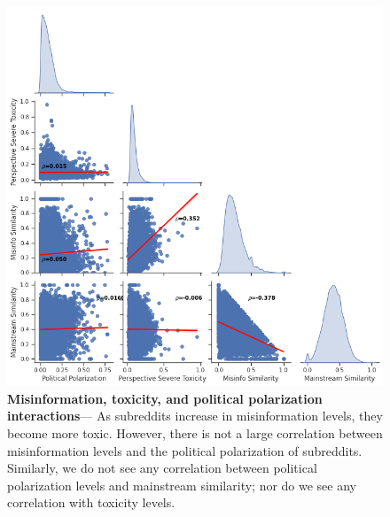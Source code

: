 \begin{figure}
\begin{minipage}[l]{0.6\textwidth}
\includegraphics[width=1\columnwidth]{figures/cross_graphs.png} 
\end{minipage}
\begin{minipage}[l]{0.35\textwidth}
\caption{\textbf{Misinformation, toxicity, and political polarization interactions}--- As subreddits increase in misinformation levels, they become more toxic. However, there is not a large correlation between misinformation levels and the political polarization of subreddits. Similarly, we do not see any correlation between political polarization levels and mainstream similarity; nor do we see any correlation with toxicity levels.\label{figure:cross-graph} }
\end{minipage}

\end{figure}


